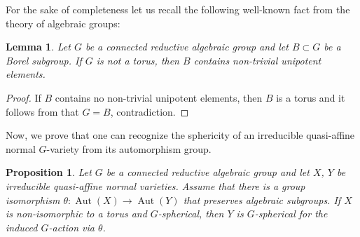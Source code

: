 \documentclass[11pt]{article}
\numberwithin{equation}{section}
\theoremstyle{plain}
\newtheorem{lemma}[theorem]{Lemma}
\newtheorem{proposition}[theorem]{Proposition}
\theoremstyle{definition}
\DeclareMathOperator{\Aut}{Aut}
\begin{document}
For the sake of completeness let us recall the following well-known fact from the theory of
algebraic groups:

\begin{lemma}
\label{lem.B_contains_unipotent_elements}
Let $G$ be a connected reductive algebraic group and let $B \subset G$ be a Borel subgroup.
If $G$ is not a torus, then $B$ contains non-trivial unipotent elements.
\end{lemma}

\begin{proof}
If $B$ contains no non-trivial unipotent elements, then $B$ is a torus and it follows from
\cite[Prop.\,21.4B]{Hu1975Linear-algebraic-g} that $G = B$, contradiction.
\end{proof}

Now, we prove that one can recognize the sphericity of an irreducible
quasi-affine normal $G$-variety from its automorphism group.

\begin{proposition}
\label{prop.iso_and_sphericity}
Let $G$ be a connected reductive algebraic group and
let $X$, $Y$ be irreducible quasi-affine normal varieties.
Assume that there is a group isomorphism
$\theta \colon \Aut(X) \to \Aut(Y)$ that preserves algebraic subgroups.
If $X$ is non-isomorphic to a torus and $G$-spherical,
then $Y$ is $G$-spherical for the induced $G$-action via $\theta$.
\end{proposition}
\end{document}
